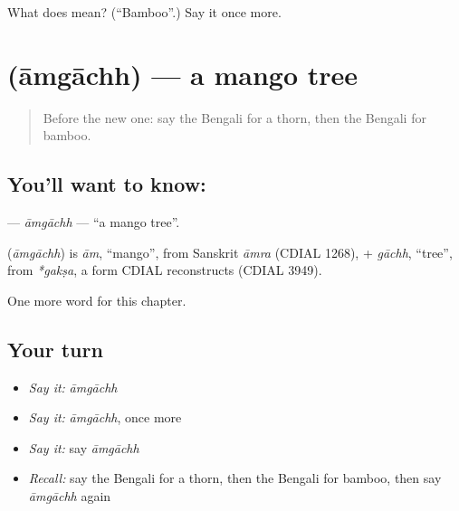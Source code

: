 \begin{tcolorbox}[breakable,colback=teal!4,colframe=teal!35!black,title={Before you move on}]
What does  mean? (\textquotedblleft{}Bamboo\textquotedblright{}.) Say it once more.
\end{tcolorbox}
\section[\texorpdfstring{\bn{আমগাছ} (āmgāchh)}{আমগাছ (āmgāchh)}]{ (āmgāchh) — a mango tree}

\label{lesson:BN-C115-amgachh}



\begin{quote}
Before the new one: say the Bengali for a thorn, then the Bengali for bamboo.
\end{quote}

\subsection*{You'll want to know: }
\textbf{} — \emph{āmgāchh} — \textquotedblleft{}a mango tree\textquotedblright{}.

\begin{cousinweb}
\textbf{} (\emph{āmgāchh}) is \emph{ām}, \textquotedblleft{}mango\textquotedblright{}, from Sanskrit \emph{āmra} (CDIAL 1268), + \emph{gāchh}, \textquotedblleft{}tree\textquotedblright{}, from \emph{*gakṣa}, a form CDIAL reconstructs (CDIAL 3949).
\end{cousinweb}

\begin{grammarlens}[title={What you've built}]
One more word for this chapter.
\end{grammarlens}

\subsection*{Your turn}
\begin{itemize}
\raggedright
  \item \emph{Say it:} \emph{āmgāchh}
  \item \emph{Say it:} \emph{āmgāchh}, once more
  \item \emph{Say it:} say \emph{āmgāchh}
  \item \emph{Recall:} say the Bengali for a thorn, then the Bengali for bamboo, then say \emph{āmgāchh} again
\end{itemize}

